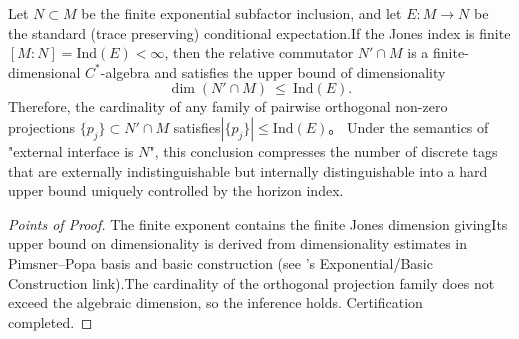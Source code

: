 \begin{proposition}\label{prop:dephys-relative-commutant-dimension-index-cap}Let \(N\subset M\) be the finite exponential subfactor inclusion, and let \(E:M\to N\) be the standard (trace preserving) conditional expectation.If the Jones index is finite \([M:N]=\mathrm{Ind}(E)<\infty\), then the relative commutator \(N'\cap M\) is a finite-dimensional \(C^\ast\)-algebra and satisfies the upper bound of dimensionality\begin{equation}\label{eq:dephys-relative-commutant-dimension-bound}
\boxed{\;\dim(N'\cap M)\ \le\ \mathrm{Ind}(E).\;}
\end{equation}
Therefore, the cardinality of any family of pairwise orthogonal non-zero projections \(\{p_j\}\subset N'\cap M\) satisfies\(
|\{p_j\}|\le \mathrm{Ind}(E)
\)。
Under the semantics of "external interface is \(N\)", this conclusion compresses the number of discrete tags that are externally indistinguishable but internally distinguishable into a hard upper bound uniquely controlled by the horizon index.\end{proposition}

\begin{proof}[Points of Proof]The finite exponent contains the finite Jones dimension givingIts upper bound on dimensionality is derived from dimensionality estimates in Pimsner--Popa basis and basic construction (see \cite{PimsnerPopa1986EntropyIndexSubfactors}'s Exponential/Basic Construction link).The cardinality of the orthogonal projection family does not exceed the algebraic dimension, so the inference holds. Certification completed.\end{proof}




